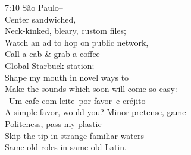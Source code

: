 7:10 São Paulo-- \\
Center sandwiched, \\
Neck-kinked, bleary, custom files; \\
Watch an ad to hop on public network, \\
Call a cab \& grab a coffee \\
Global Starbuck station; \\
Shape my mouth in novel ways to \\
Make the sounds which soon will come so easy: \\
--Um cafe com leite--por favor--e créjito \\
A simple favor, would you? Minor pretense, game \\
Politeness, pass my plastic-- \\
Skip the tip in strange familiar waters-- \\
Same old roles in same old Latin.